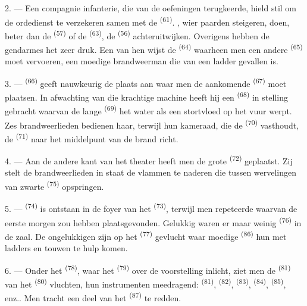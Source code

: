 2. --- Een compagnie infanterie, die van de oefeningen terugkeerde, hield stil om de
ordedienst te verzekeren samen met de  \textsuperscript{(61)}.
, wier paarden steigeren, doen, beter dan de
 \textsuperscript{(57)} of de 
\textsuperscript{(63)}, de  \textsuperscript{(56)} achteruitwijken.
Overigens hebben de gendarmes het zeer druk. Een van hen wijst de 
\textsuperscript{(64)} waarheen men een andere
 \textsuperscript{(65)} moet vervoeren, een moedige brandweerman
die van een ladder gevallen is.

3. ---  \textsuperscript{(66)} geeft nauwkeurig de plaats aan waar men de
aankomende  \textsuperscript{(67)} moet plaatsen. In afwachting van die
krachtige machine heeft hij een
 \textsuperscript{(68)} in stelling gebracht waarvan de lange
 \textsuperscript{(69)} het water als een stortvloed op het vuur
werpt. Zes brandweerlieden bedienen haar, terwijl hun kameraad, die de
 \textsuperscript{(70)} vasthoudt, de 
\textsuperscript{(71)} naar het middelpunt van de brand richt.

4. --- Aan de andere kant van het theater heeft men de grote 
\textsuperscript{(72)} geplaatst. Zij stelt de brandweerlieden in staat de vlammen te naderen
die tussen wervelingen van zwarte  \textsuperscript{(75)} opspringen.

\VUsaut{5.0mm}
\VUsaut{3.4mm}

5. ---  \textsuperscript{(74)} is ontstaan in de foyer van het
 \textsuperscript{(73)}, terwijl men 
repeteerde waarvan de eerste  morgen zou hebben plaatsgevonden. Gelukkig
waren er maar weinig  \textsuperscript{(76)} in de zaal. De ongelukkigen
zijn op het  \textsuperscript{(77)} gevlucht waar moedige
 \textsuperscript{(86)} hun met ladders en touwen te hulp komen.

6. --- Onder het  \textsuperscript{(78)}, waar het
 \textsuperscript{(79)} over de voorstelling inlicht, ziet
men de  \textsuperscript{(81)} van het 
\textsuperscript{(80)} vluchten, hun instrumenten meedragend: 
\textsuperscript{(81)},  \textsuperscript{(82)},
 \textsuperscript{(83)}, 
\textsuperscript{(84)},  \textsuperscript{(85)}, enz.. Men tracht een deel van
het  \textsuperscript{(87)} te redden.

